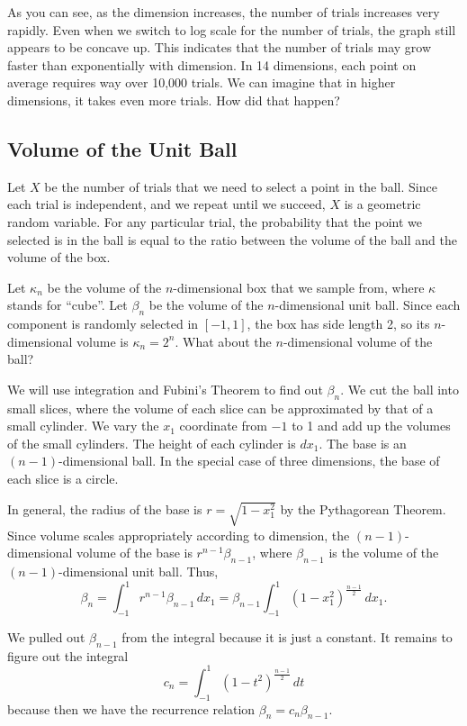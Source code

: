 \documentclass{article}
\begin{document}
As you can see, as the dimension increases, the number of trials increases very rapidly. Even when we switch to log scale for the number of trials, the graph still appears to be concave up. This indicates that the number of trials may grow faster than exponentially with dimension. In 14 dimensions, each point on average requires way over 10,000 trials. We can imagine that in higher dimensions, it takes even more trials. How did that happen?

\subsection{Volume of the Unit Ball}

Let $X$ be the number of trials that we need to select a point in the ball. Since each trial is independent, and we repeat until we succeed, $X$ is a geometric random variable. For any particular trial, the probability that the point we selected is in the ball is equal to the ratio between the volume of the ball and the volume of the box.

Let $\kappa_n$ be the volume of the $n$-dimensional box that we sample from, where $\kappa$ stands for ``cube''. Let $\beta_n$ be the volume of the $n$-dimensional unit ball. Since each component is randomly selected in $[-1, 1]$, the box has side length 2, so its $n$-dimensional volume is $\kappa_n = 2^n$. What about the $n$-dimensional volume of the ball?


We will use integration and Fubini's Theorem to find out $\beta_n$. We cut the ball into small slices, where the volume of each slice can be approximated by that of a small cylinder. We vary the $x_1$ coordinate from $-1$ to 1 and add up the volumes of the small cylinders. The height of each cylinder is $dx_1$. The base is an $(n-1)$-dimensional ball. In the special case of three dimensions, the base of each slice is a circle.

In general, the radius of the base is $r = \sqrt{1 - x_1^2}$ by the Pythagorean Theorem. Since volume scales appropriately according to dimension, the $(n-1)$-dimensional volume of the base is $r^{n-1} \beta_{n-1}$, where $\beta_{n-1}$ is the volume of the $(n-1)$-dimensional unit ball. Thus,
\[
  \beta_n = \int_{-1}^1 r^{n-1} \beta_{n-1} \, dx_1 = \beta_{n-1} \int_{-1}^1 (1 - x_1^2)^{\frac{n-1}{2}} \, dx_1.
\]

We pulled out $\beta_{n-1}$ from the integral because it is just a constant. It remains to figure out the integral
\[
  c_n = \int_{-1}^1 (1 - t^2)^{\frac{n-1}{2}} \, dt
\]
because then we have the recurrence relation $\beta_n = c_n \beta_{n - 1}$.
\end{document}
